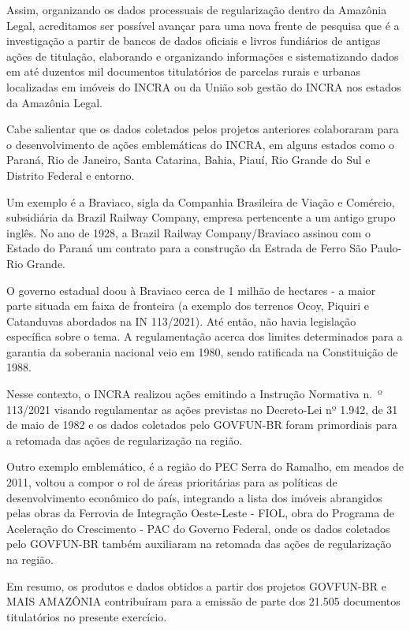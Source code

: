 \documentclass[
  letterpaper,
]{report}
\begin{document}
Assim, organizando os dados processuais de regularização dentro da
Amazônia Legal, acreditamos ser possível avançar para uma nova frente de
pesquisa que é a investigação a partir de bancos de dados oficiais e
livros fundiários de antigas ações de titulação, elaborando e
organizando informações e sistematizando dados em até duzentos mil
documentos titulatórios de parcelas rurais e urbanas localizadas em
imóveis do INCRA ou da União sob gestão do INCRA nos estados da Amazônia
Legal.~

Cabe salientar que os dados coletados pelos projetos anteriores
colaboraram para o desenvolvimento de ações emblemáticas do INCRA, em
alguns estados como o Paraná, Rio de Janeiro, Santa Catarina, Bahia,
Piauí, Rio Grande do Sul e Distrito Federal e entorno.~~~

Um exemplo é a Braviaco, sigla da Companhia Brasileira de Viação e
Comércio, subsidiária da Brazil Railway Company, empresa pertencente a
um antigo grupo inglês. No ano de 1928, a Brazil Railway
Company/Braviaco assinou com o Estado do Paraná um contrato para a
construção da Estrada de Ferro São Paulo-Rio Grande.~~

O governo estadual doou à Braviaco cerca de 1 milhão de hectares - a
maior parte situada em faixa de fronteira (a exemplo dos terrenos Ocoy,
Piquiri e Catanduvas abordados na IN 113/2021). Até então, não havia
legislação específica sobre o tema. A regulamentação acerca dos limites
determinados para a garantia da soberania nacional veio em 1980, sendo
ratificada na Constituição de 1988.\,~~

Nesse contexto, o INCRA realizou ações emitindo a Instrução Normativa
n.~º 113/2021 visando regulamentar as ações previstas no Decreto-Lei nº
1.942, de 31 de maio de 1982 e os dados coletados pelo GOVFUN-BR foram
primordiais para a retomada das ações de regularização na região.~

Outro exemplo emblemático, é a região do PEC Serra do Ramalho, em meados
de 2011, voltou a compor o rol de áreas prioritárias para as políticas
de desenvolvimento econômico do país, integrando a lista dos imóveis
abrangidos pelas obras da Ferrovia de Integração Oeste-Leste - FIOL,
obra do Programa de Aceleração do Crescimento - PAC do Governo Federal,
onde os dados coletados pelo GOVFUN-BR também auxiliaram na retomada das
ações de regularização na região.~

Em resumo, os produtos e dados obtidos a partir dos projetos GOVFUN-BR e
MAIS AMAZÔNIA contribuíram para a emissão de parte dos 21.505 documentos
titulatórios no presente exercício.~
\end{document}
